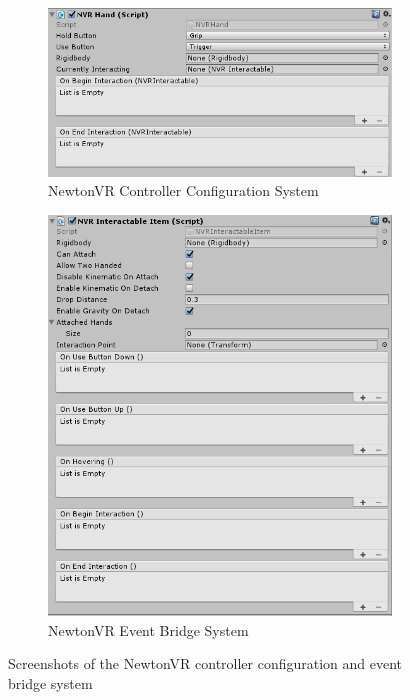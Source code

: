 \documentclass{l4proj}
\begin{document}
\begin{figure}[h]
\begin{subfigure}[h]{0.3\linewidth}
\includegraphics[width=\linewidth]{dissertation/newton_controller.png}
\caption{NewtonVR Controller Configuration System}
\end{subfigure}
\hfill
\begin{subfigure}[h]{0.21\linewidth}
\includegraphics[width=\linewidth]{dissertation/newton_grab_object.png}
\caption{NewtonVR Event Bridge System}
\end{subfigure}
\hfill
\caption{Screenshots of the NewtonVR controller configuration and event bridge system}
\end{figure}
\end{document}
